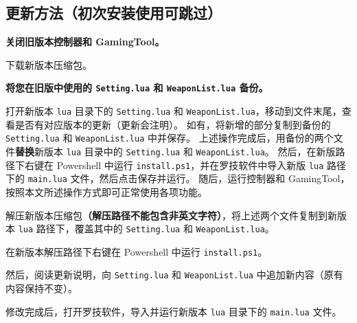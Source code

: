 \subsection{更新方法（初次安装使用可跳过）}

\textbf{\color{red}关闭旧版本控制器和 GamingTool。}

下载新版本压缩包。

\textbf{\color{red}将您在旧版中使用的 \lstinline{Setting.lua} 和 \lstinline{WeaponList.lua} 备份。}

打开新版本 \lstinline{lua} 目录下的 \lstinline{Setting.lua} 和 \lstinline{WeaponList.lua}，移动到文件末尾，查看是否有对应版本的更新（更新会注明）。
如有，将新增的部分复制到备份的 \lstinline{Setting.lua} 和 \lstinline{WeaponList.lua} 中并保存。
上述操作完成后，用备份的两个文件\textbf{\color{red}替换}新版本 \lstinline{lua} 目录中的 \lstinline{Setting.lua} 和 \lstinline{WeaponList.lua}。
然后，在新版路径下右键在 Powershell 中运行 \lstinline{install.ps1}，并在罗技软件中导入新版 \lstinline{lua} 路径下的 \lstinline{main.lua} 文件，然后点击保存并运行。
随后，运行控制器和 GamingTool，按照本文所述操作方式即可正常使用各项功能。

解压新版本压缩包\textbf{\color{red}（解压路径不能包含非英文字符）}，将上述两个文件复制到新版本 \lstinline{lua} 路径下，覆盖其中的 \lstinline{Setting.lua} 和 \lstinline{WeaponList.lua}。

在新版本解压路径下右键在 Powershell 中运行 \lstinline{install.ps1}。

然后，阅读更新说明，向 \lstinline{Setting.lua} 和 \lstinline{WeaponList.lua} 中追加新内容（原有内容保持不变）。

修改完成后，打开罗技软件，导入并运行新版本 \lstinline{lua} 目录下的 \lstinline{main.lua} 文件。